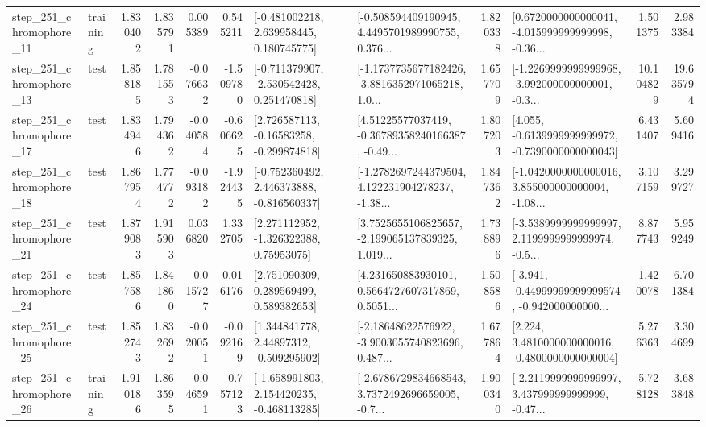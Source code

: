 \begin{tabular}{llrrrrllrlrr}
  step\_251\_chromophore\_11 &  training &      1.830402 &    1.835791 &      0.005389 &  0.545211 &    [-0.481002218, 2.639958445, 0.180745775] &  [-0.508594409190945, 4.4495701989990755, 0.376... &       1.820338 &  [0.6720000000000041, -4.015999999999998, -0.36... &            1.501375 &          2.983384 \\
  step\_251\_chromophore\_13 &      test &      1.858185 &    1.781553 &     -0.076632 & -1.509780 &   [-0.711379907, -2.530542428, 0.251470818] &  [-1.1737735677182426, -3.8816352971065218, 1.0... &       1.657709 &  [-1.2269999999999968, -3.992000000000001, -0.3... &           10.104829 &         19.635794 \\
  step\_251\_chromophore\_17 &      test &      1.834946 &    1.794362 &     -0.040584 & -0.606625 &    [2.726587113, -0.16583258, -0.299874818] &  [4.51225577037419, -0.36789358240166387, -0.49... &       1.807203 &  [4.055, -0.6139999999999972, -0.7390000000000043] &            6.431407 &          5.609416 \\
  step\_251\_chromophore\_18 &      test &      1.867954 &    1.774772 &     -0.093182 & -1.924435 &   [-0.752360492, 2.446373888, -0.816560337] &  [-1.2782697244379504, 4.122231904278237, -1.38... &       1.847362 &  [-1.0420000000000016, 3.855000000000004, -1.08... &            3.107159 &          3.299727 \\
  step\_251\_chromophore\_21 &      test &      1.879083 &    1.915903 &      0.036820 &  1.332705 &     [2.271112952, -1.326322388, 0.75953075] &  [3.7525655106825657, -2.199065137839325, 1.019... &       1.738896 &  [-3.5389999999999997, 2.1199999999999974, -0.5... &            8.877743 &          5.959249 \\
  step\_251\_chromophore\_24 &      test &      1.857586 &    1.841860 &     -0.015727 &  0.016176 &     [2.751090309, 0.289569499, 0.589382653] &  [4.231650883930101, 0.5664727607317869, 0.5051... &       1.508586 &  [-3.941, -0.44999999999999574, -0.942000000000... &            1.420078 &          6.701384 \\
  step\_251\_chromophore\_25 &      test &      1.852743 &    1.832692 &     -0.020051 & -0.092169 &     [1.344841778, 2.44897312, -0.509295902] &  [-2.18648622576922, -3.9003055740823696, 0.487... &       1.677864 &   [2.224, 3.4810000000000016, -0.4800000000000004] &            5.276363 &          3.304699 \\
  step\_251\_chromophore\_26 &  training &      1.910186 &    1.863595 &     -0.046591 & -0.757123 &   [-1.658991803, 2.154420235, -0.468113285] &  [-2.6786729834668543, 3.7372492696659005, -0.7... &       1.900340 &  [-2.2119999999999997, 3.437999999999999, -0.47... &            5.728128 &          3.683848 \\

\end{tabular}
